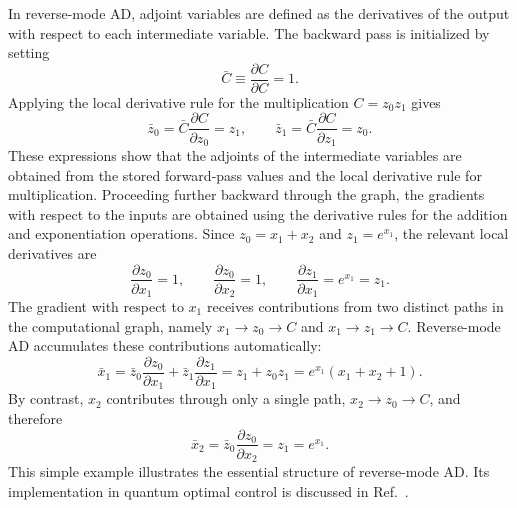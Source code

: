 In reverse-mode AD, adjoint variables are defined as the derivatives of the output with respect to each intermediate variable. The backward pass is initialized by setting
\begin{equation}
    \bar{C} \equiv \frac{\partial C}{\partial C} = 1.
\end{equation}
Applying the local derivative rule for the multiplication \(C = z_0 z_1\) gives
\begin{equation}
    \bar{z}_0 = \bar{C} \frac{\partial C}{\partial z_0} = z_1,
    \qquad
    \bar{z}_1 = \bar{C} \frac{\partial C}{\partial z_1} = z_0.
\end{equation}
These expressions show that the adjoints of the intermediate variables are obtained from the stored forward-pass values and the local derivative rule for multiplication. Proceeding further backward through the graph, the gradients with respect to the inputs are obtained using the derivative rules for the addition and exponentiation operations. Since \(z_0 = x_1 + x_2\) and \(z_1 = e^{x_1}\), the relevant local derivatives are
\begin{equation}
    \frac{\partial z_0}{\partial x_1} = 1,
    \qquad
    \frac{\partial z_0}{\partial x_2} = 1,
    \qquad
    \frac{\partial z_1}{\partial x_1} = e^{x_1} = z_1.
\end{equation}
The gradient with respect to \(x_1\) receives contributions from two distinct paths in the computational graph, namely \(x_1 \rightarrow z_0 \rightarrow C\) and \(x_1 \rightarrow z_1 \rightarrow C\). Reverse-mode AD accumulates these contributions automatically:
\begin{equation}
    \bar{x}_1
    =
    \bar{z}_0 \frac{\partial z_0}{\partial x_1}
    +
    \bar{z}_1 \frac{\partial z_1}{\partial x_1}
    =
    z_1 + z_0 z_1
    =
    e^{x_1}(x_1 + x_2 + 1).
\end{equation}
By contrast, \(x_2\) contributes through only a single path, \(x_2 \rightarrow z_0 \rightarrow C\), and therefore
\begin{equation}
    \bar{x}_2
    =
    \bar{z}_0 \frac{\partial z_0}{\partial x_2}
    =
    z_1
    =
    e^{x_1}.
\end{equation}
This simple example illustrates the essential structure of reverse-mode AD. Its implementation in quantum optimal control is discussed in Ref.~\cite{pacleung2017speedup}.
